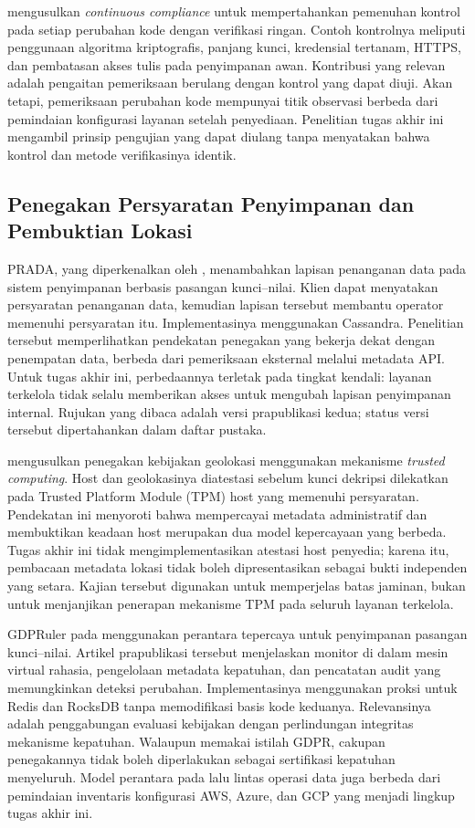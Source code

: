 \textcite{kellogg2020} mengusulkan \textit{continuous compliance} untuk mempertahankan pemenuhan kontrol pada setiap perubahan kode dengan verifikasi ringan. Contoh kontrolnya meliputi penggunaan algoritma kriptografis, panjang kunci, kredensial tertanam, HTTPS, dan pembatasan akses tulis pada penyimpanan awan. Kontribusi yang relevan adalah pengaitan pemeriksaan berulang dengan kontrol yang dapat diuji. Akan tetapi, pemeriksaan perubahan kode mempunyai titik observasi berbeda dari pemindaian konfigurasi layanan setelah penyediaan. Penelitian tugas akhir ini mengambil prinsip pengujian yang dapat diulang tanpa menyatakan bahwa kontrol dan metode verifikasinya identik.

\subsection{Penegakan Persyaratan Penyimpanan dan Pembuktian Lokasi}
PRADA, yang diperkenalkan oleh \textcite{prada2020}, menambahkan lapisan penanganan data pada sistem penyimpanan berbasis pasangan kunci--nilai. Klien dapat menyatakan persyaratan penanganan data, kemudian lapisan tersebut membantu operator memenuhi persyaratan itu. Implementasinya menggunakan Cassandra. Penelitian tersebut memperlihatkan pendekatan penegakan yang bekerja dekat dengan penempatan data, berbeda dari pemeriksaan eksternal melalui metadata API. Untuk tugas akhir ini, perbedaannya terletak pada tingkat kendali: layanan terkelola tidak selalu memberikan akses untuk mengubah lapisan penyimpanan internal. Rujukan yang dibaca adalah versi prapublikasi kedua; status versi tersebut dipertahankan dalam daftar pustaka.

\textcite{abbas2023} mengusulkan penegakan kebijakan geolokasi menggunakan mekanisme \textit{trusted computing}. Host dan geolokasinya diatestasi sebelum kunci dekripsi dilekatkan pada Trusted Platform Module (TPM) host yang memenuhi persyaratan. Pendekatan ini menyoroti bahwa mempercayai metadata administratif dan membuktikan keadaan host merupakan dua model kepercayaan yang berbeda. Tugas akhir ini tidak mengimplementasikan atestasi host penyedia; karena itu, pembacaan metadata lokasi tidak boleh dipresentasikan sebagai bukti independen yang setara. Kajian tersebut digunakan untuk memperjelas batas jaminan, bukan untuk menjanjikan penerapan mekanisme TPM pada seluruh layanan terkelola.

GDPRuler pada \textcite{gdpruler2026} menggunakan perantara tepercaya untuk penyimpanan pasangan kunci--nilai. Artikel prapublikasi tersebut menjelaskan monitor di dalam mesin virtual rahasia, pengelolaan metadata kepatuhan, dan pencatatan audit yang memungkinkan deteksi perubahan. Implementasinya menggunakan proksi untuk Redis dan RocksDB tanpa memodifikasi basis kode keduanya. Relevansinya adalah penggabungan evaluasi kebijakan dengan perlindungan integritas mekanisme kepatuhan. Walaupun memakai istilah GDPR, cakupan penegakannya tidak boleh diperlakukan sebagai sertifikasi kepatuhan menyeluruh. Model perantara pada lalu lintas operasi data juga berbeda dari pemindaian inventaris konfigurasi AWS, Azure, dan GCP yang menjadi lingkup tugas akhir ini.

